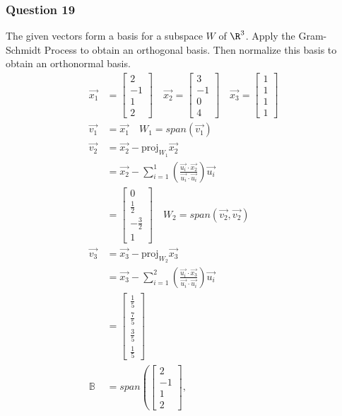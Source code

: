 \documentclass{math}
\begin{document}
\subsubsection*{Question 19}
The given vectors form a basis for a subspace \( W \) of \( \R^3 \). Apply the
Gram-Schmidt Process to obtain an orthogonal basis. Then normalize this basis
to obtain an orthonormal basis.
\begin{align*}
  \vec{x_1} &= \begin{bmatrix}2 \\ -1 \\ 1 \\ 2\end{bmatrix} \quad
    \vec{x_2} = \begin{bmatrix}3 \\ -1 \\ 0 \\ 4\end{bmatrix} \quad
    \vec{x_3} = \begin{bmatrix}1 \\ 1 \\ 1 \\ 1\end{bmatrix} \\
  \vec{v_1} &= \vec{x_1} \quad W_1 = span(\vec{v_1}) \\
  \vec{v_2} &= \vec{x_2}-\text{proj}_{W_1}\vec{x_2} \\
  &= \vec{x_2}-\sum_{i=1}^{1}
    \left(\frac{\vec{u_i}\cdot\vec{x_2}}{\vec{u_i}\cdot\vec{u_i}}\right)
    \vec{u_i} \\
  &= \begin{bmatrix}0 \\ \frac{1}{2} \\ -\frac{3}{2} \\ 1\end{bmatrix} \quad
    W_2 = span(\vec{v_2},\vec{v_2}) \\
  \vec{v_3} &= \vec{x_3}-\text{proj}_{W_2}\vec{x_3} \\
  &= \vec{x_3}-\sum_{i=1}^{2}
    \left(\frac{\vec{u_i}\cdot\vec{x_3}}{\vec{u_i}\cdot\vec{u_i}}\right)
    \vec{u_i} \\
  &= \begin{bmatrix}\frac{1}{5} \\ \frac{7}{5} \\ \frac{3}{5} \\ \frac{1}{5}
    \end{bmatrix} \\
  \mathbb{B} &= span\left(
    \begin{bmatrix}2 \\ -1 \\ 1 \\ 2\end{bmatrix},

\end{align*}
\end{document}
